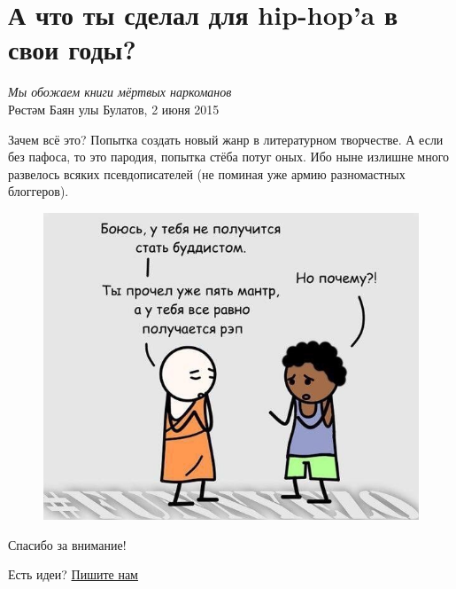 \documentclass{ideas}
\begin{document}
\section*{А что ты сделал для hip-hop'a в свои годы?}\label{section:one}
\begin{displayquote}
\begin{flushright}
    \emph{Мы обожаем книги мёртвых наркоманов}\\
    Рөстәм Баян улы Булатов, 2 июня 2015
\end{flushright}
\end{displayquote}
Зачем всё это? Попытка создать новый жанр в литературном творчестве.
А если без пафоса, то это пародия, попытка стёба потуг оных. Ибо ныне излишне много развелось всяких псевдописателей (не поминая уже армию разномастных блоггеров).

\begin{figure}[ht!]
    \centering
    \includegraphics[width=\textwidth]{hip-zen}
\end{figure}







\vspace*{\fill}
\begin{center}
    \large 
    Спасибо за внимание!

    \vspace{2em}
    Есть идеи?
    \href{mailto:anto-kha0@rambler.ru}{Пишите нам}
\end{center}
\vfill
\thispagestyle{empty}
\end{document}
